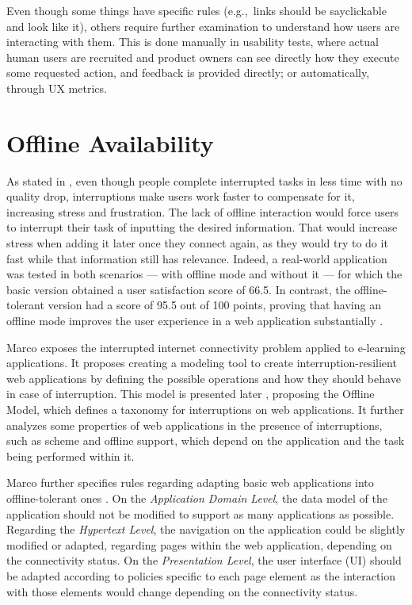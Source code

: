 Even though some things have specific rules (e.g.,\ links should be say{clickable} and look like it), others require further examination to understand how users are interacting with them. This is done manually in usability tests, where actual human users are recruited and product owners can see directly how they execute some requested action, and feedback is provided directly; or automatically, through UX metrics.

\section{Offline Availability}\label{sec:offline-avail-sota}

As stated in \cite{Mark2008}, even though people complete interrupted tasks in less time with no quality drop, interruptions make users work faster to compensate for it, increasing stress and frustration. The lack of offline interaction would force users to interrupt their task of inputting the desired information. That would increase stress when adding it later once they connect again, as they would try to do it fast while that information still has relevance. Indeed, a real-world application was tested in both scenarios --- with offline mode and without it --- for which the basic version obtained a user satisfaction score of 66.5. In contrast, the offline-tolerant version had a score of 95.5 out of 100 points, proving that having an offline mode improves the user experience in a web application substantially \cite{Marco2015}. 

Marco \cite{Marco2013} exposes the interrupted internet connectivity problem applied to e-learning applications. It proposes creating a modeling tool to create interruption-resilient web applications by defining the possible operations and how they should behave in case of interruption. This model is presented later \cite{Abertos-Marco2017}, proposing the Offline Model, which defines a taxonomy for interruptions on web applications. It further analyzes some properties of web applications in the presence of interruptions, such as scheme and offline support, which depend on the application and the task being performed within it.

Marco further specifies rules regarding adapting basic web applications into offline-tolerant ones \cite{Marco2015}. On the \textit{Application Domain Level}, the data model of the application should not be modified to support as many applications as possible. Regarding the \textit{Hypertext Level}, the navigation on the application could be slightly modified or adapted, regarding pages within the web application, depending on the connectivity status. On the \textit{Presentation Level}, the user interface (UI) should be adapted according to policies specific to each page element as the interaction with those elements would change depending on the connectivity status.


